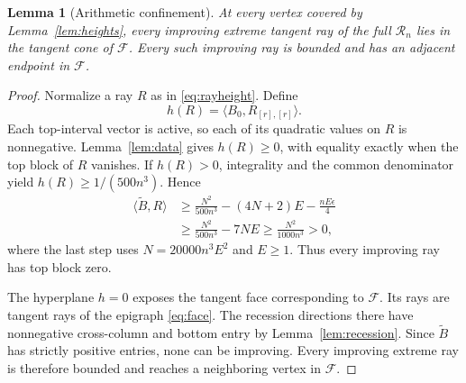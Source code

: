 \documentclass[11pt]{article}
\newtheorem{lemma}[theorem]{Lemma}
\theoremstyle{remark}\newtheorem{remark}[theorem]{Remark}
\newcommand{\Ry}{\mathcal R}\newcommand{\tr}{\operatorname{tr}}
\newcommand{\ip}[2]{\langle #1,#2\rangle}\newcommand{\trans}{^{\mathsf T}}
\begin{document}
\begin{lemma}[Arithmetic confinement]\label{lem:confinement}
At every vertex covered by Lemma~\ref{lem:heights}, every improving extreme tangent ray of the full $\Ry_n$ lies in the tangent cone of $\mathcal F$. Every such improving ray is bounded and has an adjacent endpoint in $\mathcal F$.
\end{lemma}
\begin{proof}
Normalize a ray $R$ as in \eqref{eq:rayheight}. Define
\[
 h(R)=\ip{B_0}{R_{[r],[r]}}.
\]
Each top-interval vector is active, so each of its quadratic values on $R$ is nonnegative. Lemma~\ref{lem:data} gives $h(R)\ge0$, with equality exactly when the top block of $R$ vanishes. If $h(R)>0$, integrality and the common denominator yield $h(R)\ge1/(500n^3)$. Hence
\begin{align*}
 \ip{\widetilde B}R
 &\ge\frac{N^2}{500n^3}-(4N+2)E-\frac{nE\epsilon}{4}\\
 &\ge\frac{N^2}{500n^3}-7NE
 \ge\frac{N^2}{1000n^3}>0,
\end{align*}
where the last step uses $N=20000n^3E^2$ and $E\ge1$. Thus every improving ray has top block zero.

The hyperplane $h=0$ exposes the tangent face corresponding to $\mathcal F$. Its rays are tangent rays of the epigraph \eqref{eq:face}. The recession directions there have nonnegative cross-column and bottom entry by Lemma~\ref{lem:recession}. Since $\widetilde B$ has strictly positive entries, none can be improving. Every improving extreme ray is therefore bounded and reaches a neighboring vertex in $\mathcal F$.
\end{proof}
\end{document}
